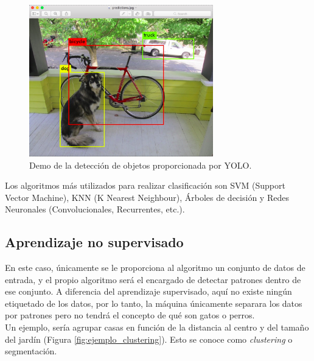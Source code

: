 \begin{itemize}
\begin{figure} [h!]
  \begin{center}
    \includegraphics[width=8cm]{figs/yolo.png}
  \end{center}
  \caption{Demo de la detección de objetos proporcionada por YOLO.}
  \label{fig:yolo}
\end{figure}

Los algoritmos más utilizados para realizar clasificación son SVM (Support Vector Machine), KNN (K Nearest Neighbour), Árboles de decisión y Redes Neuronales (Convolucionales, Recurrentes, etc.).

\end{itemize}

\subsection{Aprendizaje no supervisado}

En este caso, únicamente se le proporciona al algoritmo un conjunto de datos de entrada, y el propio algoritmo será el encargado de detectar patrones dentro de ese conjunto. A diferencia del aprendizaje supervisado, aquí no existe ningún etiquetado de los datos, por lo tanto, la máquina únicamente separara los datos por patrones pero no tendrá el concepto de qué son gatos o perros.\\

Un ejemplo, sería agrupar casas en función de la distancia al centro y del tamaño del jardín (Figura \ref{fig:ejemplo_clustering}). Esto se conoce como \textit{clustering} o segmentación.\\

